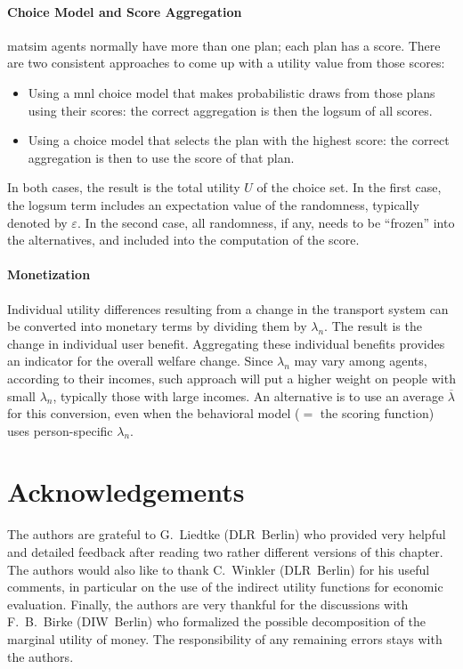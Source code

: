 \paragraph*{Choice Model and Score Aggregation}

\gls{matsim} agents normally have more than one plan; each plan has a score.  There are two consistent approaches to come up with a utility value from those scores:
\begin{itemize}\styleItemize

\item Using a \gls{mnl} choice model that makes probabilistic draws from those plans using their scores: the correct aggregation is then the logsum of all scores.

\item Using a choice model that selects the plan with the highest score: the correct aggregation is then to use the score of that plan.

\end{itemize}
In both cases, the result is the total utility $U$ of the choice set.  In the first case, the logsum term includes an expectation value of the randomness,  typically denoted by $\varepsilon$.  In the second case, all randomness, if any, needs to be ``frozen'' into the alternatives, and included into the computation of the score.

\paragraph*{Monetization}

Individual utility differences resulting from a change in the transport system can be converted into monetary terms by dividing them by $\lambda_n$. The result is the change in individual user benefit. Aggregating these individual benefits provides an indicator for the overall welfare change.
%
Since $\lambda_n$ may vary among agents, \eg according to their incomes, such approach will put a higher weight on people with small $\lambda_n$, typically those with large incomes.  An alternative is to use an average $\overline\lambda$ for this conversion, even when the behavioral model ($=$ the scoring function) uses person-specific $\lambda_n$.

\section*{Acknowledgements}
The authors are grateful to G.~Liedtke (DLR~Berlin) who provided very helpful and detailed feedback after reading two rather different versions of this chapter.
%
The authors would also like to thank C.~Winkler (DLR~Berlin) for his useful comments, in particular on the use of the indirect utility functions for economic evaluation.
%
Finally, the authors are very thankful for the discussions with F.~B.~Birke (DIW~Berlin) who formalized the possible decomposition of the marginal utility of money.
%
The responsibility of any remaining errors stays with the authors.


